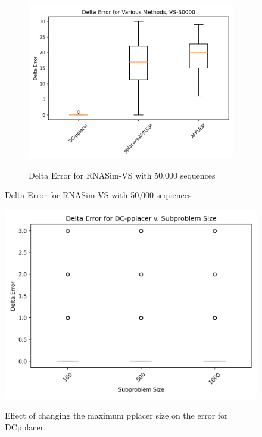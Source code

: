 \documentclass[10pt]{article}
\begin{document}
\begin{figure}[h]
\begin{subfigure}{0.5\textwidth}
\includegraphics[width=\textwidth]{Figs/VS-delta-error-50000.png}
\label{fig:error50000}
\caption{Delta Error for RNASim-VS with 50,000 sequences}
\end{subfigure}
\end{figure}

\begin{figure}[h]
\centering
\includegraphics[width=\textwidth]{Figs/varying-subproblem-size.png}
\label{fig:varying-size}
\caption{Effect of changing the maximum pplacer size on the error for DCpplacer.}
\end{figure}


\end{document}
